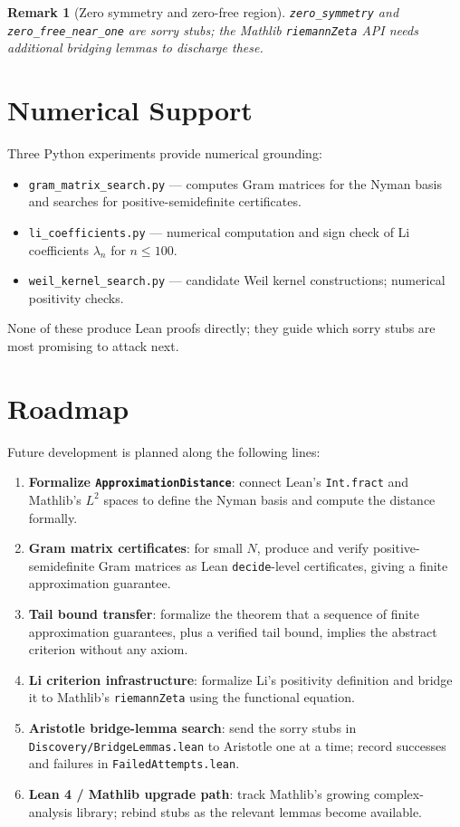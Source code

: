 \documentclass[11pt,a4paper]{article}
\newtheorem{remark}[theorem]{Remark}
\begin{document}
\begin{remark}[Zero symmetry and zero-free region]
  \texttt{zero\_symmetry} and \texttt{zero\_free\_near\_one} are sorry stubs;
  the Mathlib \texttt{riemannZeta} API needs additional bridging lemmas to
  discharge these.
\end{remark}

\section{Numerical Support}

Three Python experiments provide numerical grounding:
\begin{itemize}
  \item \texttt{gram\_matrix\_search.py} --- computes Gram matrices for the
        Nyman basis and searches for positive-semidefinite certificates.
  \item \texttt{li\_coefficients.py} --- numerical computation and sign check
        of Li coefficients $\lambda_n$ for $n \leq 100$.
  \item \texttt{weil\_kernel\_search.py} --- candidate Weil kernel
        constructions; numerical positivity checks.
\end{itemize}
None of these produce Lean proofs directly; they guide which sorry stubs are
most promising to attack next.

\section{Roadmap}

Future development is planned along the following lines:

\begin{enumerate}
  \item \textbf{Formalize \texttt{ApproximationDistance}}: connect Lean's
        \texttt{Int.fract} and Mathlib's $L^2$ spaces to define the Nyman
        basis and compute the distance formally.
  \item \textbf{Gram matrix certificates}: for small $N$, produce and verify
        positive-semidefinite Gram matrices as Lean \texttt{decide}-level
        certificates, giving a finite approximation guarantee.
  \item \textbf{Tail bound transfer}: formalize the theorem that a sequence of
        finite approximation guarantees, plus a verified tail bound, implies
        the abstract criterion without any axiom.
  \item \textbf{Li criterion infrastructure}: formalize Li's positivity
        definition and bridge it to Mathlib's \texttt{riemannZeta} using the
        functional equation.
  \item \textbf{Aristotle bridge-lemma search}: send the sorry stubs in
        \texttt{Discovery/BridgeLemmas.lean} to Aristotle one at a time;
        record successes and failures in \texttt{FailedAttempts.lean}.
  \item \textbf{Lean 4 / Mathlib upgrade path}: track Mathlib's growing
        complex-analysis library; rebind stubs as the relevant lemmas become
        available.
\end{enumerate}
\end{document}
